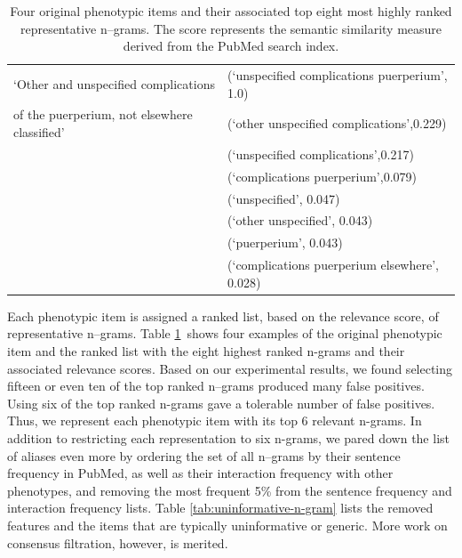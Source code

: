 \documentclass{sig-alternate-05-2015}
\begin{document}
\begin{table}
\begin{center}
\begin{tabular}{l l}
\hline
`Other and unspecified complications & (`unspecified complications puerperium', 1.0)\\
of the puerperium, not elsewhere classified'  &  (`other unspecified complications',0.229)\\
								& (`unspecified complications',0.217)\\
								&  (`complications puerperium',0.079)\\
								& (`unspecified', 0.047)\\
								& (`other unspecified', 0.043) \\
								& (`puerperium', 0.043) \\
								& (`complications puerperium elsewhere', 0.028) \\ 
\bottomrule
\end{tabular}
\end{center}
\caption{Four original phenotypic items and their associated top eight most highly ranked representative n--grams. The score represents the semantic similarity measure derived from the PubMed search index.}
\label{tab:pheno-n-gram}
\end{table}

Each phenotypic item is assigned a ranked list, based on the relevance score, of representative n--grams.
Table \ref{tab:pheno-n-gram}~shows four examples of the original phenotypic item and the ranked list with the eight highest ranked n-grams and their associated relevance scores.
Based on our experimental results, we found selecting fifteen or even ten of the top ranked n--grams produced many false positives. Using six of the top ranked n-grams gave a tolerable number of false positives. Thus, we represent each phenotypic item with its top 6 relevant n-grams.
In addition to restricting each representation to six n-grams, we pared down the list of aliases even more by ordering the set of all n--grams by their sentence frequency in PubMed, as well as their interaction frequency with other phenotypes, and removing the most frequent 5\% from the sentence frequency and interaction frequency lists.
Table \ref{tab:uninformative-n-gram} lists the removed features and the items that are typically uninformative or generic.
More work on consensus filtration, however, is merited.
\end{document}
